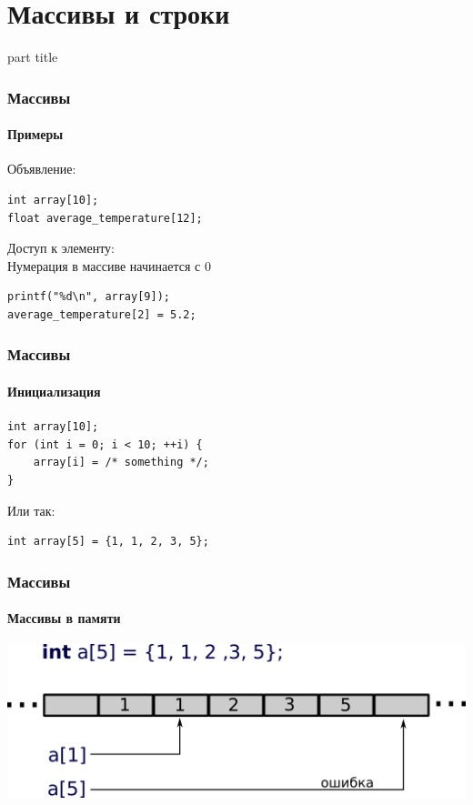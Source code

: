 \documentclass[14pt,pdf,hyperref={unicode}]{beamer}
\begin{document}
\section{Массивы и строки}
\begin{frame}
\begin{center}
\begin{beamercolorbox}[sep=8pt,center]{part
title}
\insertsection
\end{beamercolorbox}
\end{center}
\end{frame}


\begin{frame}[fragile]
\frametitle{Массивы} 
\framesubtitle{Примеры}
Объявление:\\
\begin{lstlisting}
int array[10];
float average_temperature[12];
\end{lstlisting}
Доступ к элементу:\\
Нумерация в массиве начинается с 0\\
\begin{lstlisting}
printf("%d\n", array[9]);
average_temperature[2] = 5.2;
\end{lstlisting}
\end{frame}

\begin{frame}[fragile]
\frametitle{Массивы} 
\framesubtitle{Инициализация}
\begin{lstlisting}
int array[10];
for (int i = 0; i < 10; ++i) {
    array[i] = /* something */;
}
\end{lstlisting}
Или так:\\
\begin{lstlisting}
int array[5] = {1, 1, 2, 3, 5};
\end{lstlisting}
\end{frame}

\begin{frame}[fragile]
\frametitle{Массивы} 
\framesubtitle{Массивы в памяти}
\begin{center}
\includegraphics[width=0.95\linewidth]{images/array_in_memory.png}
\end{center}
\end{frame}
\end{document}
